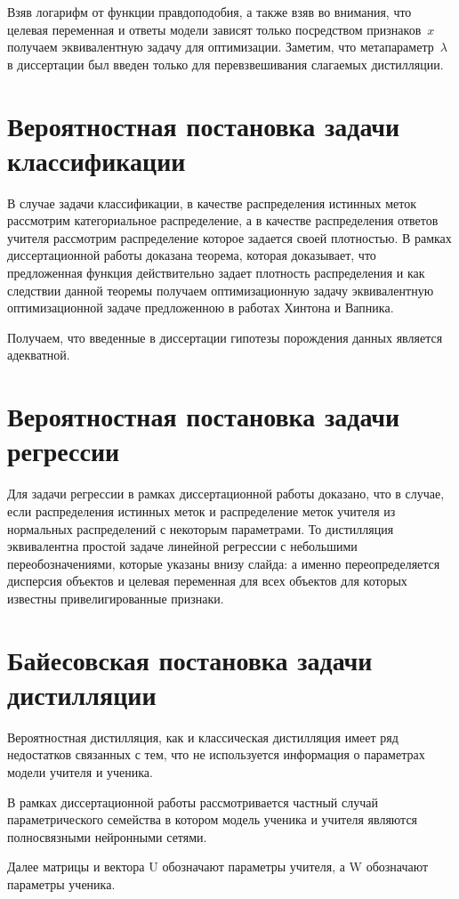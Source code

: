 \documentclass[12pt, twoside]{article}
\begin{document}
Взяв логарифм от функции правдоподобия, а также взяв во внимания, что целевая переменная и ответы модели зависят только посредством признаков~$x$ получаем эквивалентную задачу для оптимизации. Заметим, что метапараметр~$\lambda$ в диссертации был введен только для перевзвешивания слагаемых дистилляции.

\section{Вероятностная постановка задачи классификации}
В случае задачи классификации, в качестве распределения истинных меток рассмотрим категориальное распределение, а в качестве распределения ответов учителя рассмотрим распределение которое задается своей плотностью.
В рамках диссертационной работы доказана теорема, которая доказывает, что предложенная функция действительно задает плотность распределения и как следствии данной теоремы получаем оптимизационную задачу эквивалентную оптимизационной задаче предложенною в работах Хинтона и Вапника.

Получаем, что введенные в диссертации гипотезы порождения данных является адекватной.

\section{Вероятностная постановка задачи регрессии}

Для задачи регрессии в рамках диссертационной работы доказано, что в случае, если распределения истинных меток и распределение меток учителя из нормальных распределений с некоторым параметрами. То дистилляция эквивалентна простой задаче линейной регрессии с небольшими переобозначениями, которые указаны внизу слайда: а именно переопределяется дисперсия объектов и целевая переменная для всех объектов для которых известны привелигированные признаки.

\section{Байесовская постановка задачи дистилляции}
Вероятностная дистилляция, как и классическая дистилляция имеет ряд недостатков связанных с тем, что не используется информация о параметрах модели учителя и ученика.

В рамках диссертационной работы рассмотривается частный случай параметрического семейства в котором модель ученика и учителя являются полносвязными нейронными сетями.

Далее матрицы и вектора U обозначают параметры учителя, а W обозначают параметры ученика.
\end{document}
